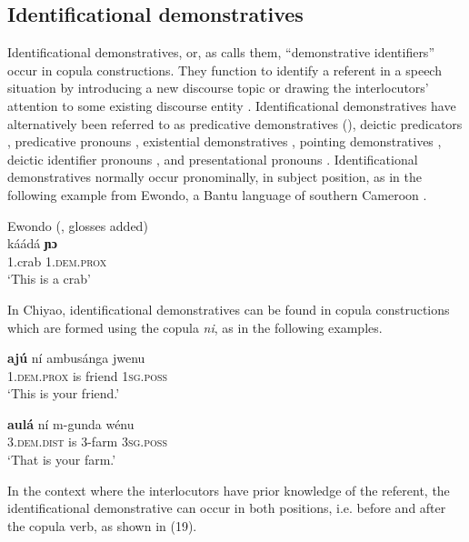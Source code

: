 \documentclass[output=paper,
            colorlinks, citecolor=brown
            ,draftmode
		  ]{langscibook}
\begin{document}
\subsection{Identificational demonstratives}\label{sec:taji:4.4}

Identificational demonstratives, or, as \citet{Diessel1999morphosyntax} calls them, ``demonstrative identifiers'' occur in copula constructions. They function to identify a referent in a speech situation by introducing a new discourse topic or drawing the interlocutors’ attention to some existing discourse entity \citep{Amfo2007}. Identificational demonstratives have alternatively been referred to as predicative demonstratives (\citealt{Denny1982, Heath1984}), deictic predicators \citep{Schuh1977}, predicative pronouns \citep{Marconnes1931}, existential demonstratives \citep{Benton1971}, pointing demonstratives \citep{Rehg1981}, deictic identifier pronouns \citep{Carlson1994}, and presentational pronouns \citep{Moltmann2013}. Identificational demonstratives normally occur pronominally, in subject position, as in the following example from Ewondo, a Bantu language of southern Cameroon \citep[19]{Diessel1999morphosyntax}.

\ea Ewondo (\citealt[19]{Diessel1999morphosyntax}, glosses added)\\
    \label{ex:taji:17}
    \gll káádá      \textbf{ɲɔ}\\
  1.crab     1.\textsc{dem.prox}\\ 
  \glt ‘This is a crab’     
\z

In Chiyao, identificational demonstratives can be found in copula constructions which are formed using the copula \textit{ni}, as in the following examples.

\ea%
    \label{ex:taji:18}
    \ea\label{ex:taji:18a}\gll \textbf{ajú}                        ní    ambusánga      jwenu\\
    1.\textsc{dem.prox}      is    friend              \textsc{1sg.poss}\\        
  \glt ‘This is your friend.’

    \ex\label{ex:taji:18b} \gll  \textbf{aulá}                   ní    m-gunda    wénu\\
      3.\textsc{dem.dist}      is    3-farm        \textsc{3sg.poss}\\
    \glt  ‘That is your farm.’
    \z
\z

In the context where the interlocutors have prior knowledge of the referent, the identificational demonstrative can occur in both positions, i.e. before and after the copula verb, as shown in (19). 
\end{document}
